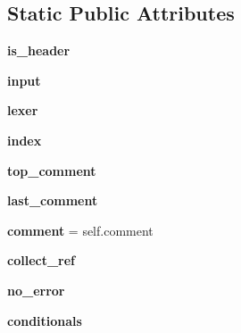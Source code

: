 \subsection*{Static Public Attributes}
\begin{DoxyCompactItemize}
\item 
\mbox{\label{classapibuild_1_1_c_parser_ae577497cfd39a28008c6500d714c4811}} 
{\bfseries is\+\_\+header}
\item 
\mbox{\label{classapibuild_1_1_c_parser_a1c064c2a8f456038e0c31340a5bb985a}} 
{\bfseries input}
\item 
\mbox{\label{classapibuild_1_1_c_parser_a4439809f9398d528f46a609487ba7308}} 
{\bfseries lexer}
\item 
\mbox{\label{classapibuild_1_1_c_parser_a6b078275e3bbe56e7d5987c3e52a8365}} 
{\bfseries index}
\item 
\mbox{\label{classapibuild_1_1_c_parser_a93bbb04fda540e00fb1453ebee5e1c8a}} 
{\bfseries top\+\_\+comment}
\item 
\mbox{\label{classapibuild_1_1_c_parser_a0f0112106b88370aa0dc0971bfc7b240}} 
{\bfseries last\+\_\+comment}
\item 
\mbox{\label{classapibuild_1_1_c_parser_a030e211614873b22f14af69117a9f8f5}} 
{\bfseries comment} = self.\+comment
\item 
\mbox{\label{classapibuild_1_1_c_parser_aa5d456c33c9d0c1b1e6070abb597a16f}} 
{\bfseries collect\+\_\+ref}
\item 
\mbox{\label{classapibuild_1_1_c_parser_ad0250beb68acf8c0ef420ee9d3368a9f}} 
{\bfseries no\+\_\+error}
\item 
\mbox{\label{classapibuild_1_1_c_parser_a52b12758ca17a04695d3b701749532ec}} 
{\bfseries conditionals}
\item 
\mbox{\label{classapibuild_1_1_c_parser_a6fd53b8580dd750f1a756602f608cfc6}} 

\end{DoxyCompactItemize}
